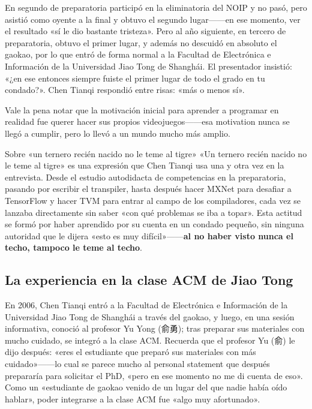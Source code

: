 En segundo de preparatoria participó en la eliminatoria del NOIP y no pasó, pero asistió como oyente a la final y obtuvo el segundo lugar------en ese momento, ver el resultado «sí le dio bastante tristeza». Pero al año siguiente, en tercero de preparatoria, obtuvo el primer lugar, y además no descuidó en absoluto el gaokao, por lo que entró de forma normal a la Facultad de Electrónica e Información de la Universidad Jiao Tong de Shanghái. El presentador insistió: «¿en ese entonces siempre fuiste el primer lugar de todo el grado en tu condado?». Chen Tianqi respondió entre risas: «más o menos sí».

Vale la pena notar que la motivación inicial para aprender a programar en realidad fue querer hacer sus propios videojuegos------esa motivation nunca se llegó a cumplir, pero lo llevó a un mundo mucho más amplio.

\begin{warningbox}{Sobre «un ternero recién nacido no le teme al tigre»}
«Un ternero recién nacido no le teme al tigre» es una expresión que Chen Tianqi usa una y otra vez en la entrevista. Desde el estudio autodidacta de competencias en la preparatoria, pasando por escribir el transpiler, hasta después hacer MXNet para desafiar a TensorFlow y hacer TVM para entrar al campo de los compiladores, cada vez se lanzaba directamente sin saber «con qué problemas se iba a topar». Esta actitud se formó por haber aprendido por su cuenta en un condado pequeño, sin ninguna autoridad que le dijera «esto es muy difícil»------\textbf{al no haber visto nunca el techo, tampoco le teme al techo}.
\end{warningbox}

\subsection{La experiencia en la clase ACM de Jiao Tong}

En 2006, Chen Tianqi entró a la Facultad de Electrónica e Información de la Universidad Jiao Tong de Shanghái a través del gaokao, y luego, en una sesión informativa, conoció al profesor Yu Yong (俞勇); tras preparar sus materiales con mucho cuidado, se integró a la clase ACM. Recuerda que el profesor Yu (俞) le dijo después: «eres el estudiante que preparó sus materiales con más cuidado»------lo cual se parece mucho al personal statement que después prepararía para solicitar el PhD, «pero en ese momento no me di cuenta de eso». Como un «estudiante de gaokao venido de un lugar del que nadie había oído hablar», poder integrarse a la clase ACM fue «algo muy afortunado».

